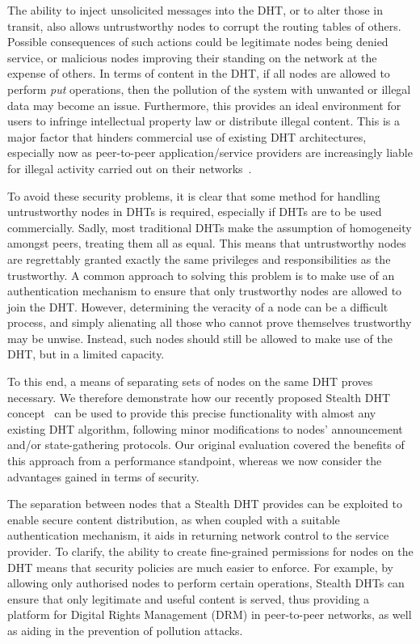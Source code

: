\documentclass{elsart3p}
\begin{document}
The ability to inject unsolicited messages into the DHT, or to alter
those in transit, also allows untrustworthy nodes to corrupt the
routing tables of others. Possible consequences of such actions
could be legitimate nodes being denied service, or malicious nodes
improving their standing on the network at the expense of others. In
terms of content in the DHT, if all nodes are allowed to perform
\emph{put} operations, then the pollution of the system with
unwanted or illegal data may become an issue. Furthermore, this
provides an ideal environment for users to infringe intellectual
property law or distribute illegal content. This is a major factor
that hinders commercial use of existing DHT architectures,
especially now as peer-to-peer application/service providers are
increasingly liable for illegal activity carried out on their
networks~\cite{court}.

To avoid these security problems, it is clear that some method for
handling untrustworthy nodes in DHTs is required, especially if DHTs
are to be used commercially. Sadly, most traditional DHTs make the
assumption of homogeneity amongst peers, treating them all as equal.
This means that untrustworthy nodes are regrettably granted exactly
the same privileges and responsibilities as the trustworthy. A
common approach to solving this problem is to make use of an
authentication mechanism to ensure that only trustworthy nodes are
allowed to join the DHT. However, determining the veracity of a node
can be a difficult process, and simply alienating all those who
cannot prove themselves trustworthy may be unwise. Instead, such
nodes should still be allowed to make use of the DHT, but in a
limited capacity.

To this end, a means of separating sets of nodes on the same DHT
proves necessary. We therefore demonstrate how our recently proposed
Stealth DHT concept~\cite{Brampton06Stealth} can be used to provide
this precise functionality with almost any existing DHT algorithm,
following minor modifications to nodes' announcement and/or
state-gathering protocols. Our original evaluation covered the
benefits of this approach from a performance standpoint, whereas we
now consider the advantages gained in terms of security.

The separation between nodes that a Stealth DHT provides can be
exploited to enable secure content distribution, as when coupled
with a suitable authentication mechanism, it aids in returning
network control to the service provider. To clarify, the ability to
create fine-grained permissions for nodes on the DHT means that
security policies are much easier to enforce. For example, by
allowing only authorised nodes to perform certain operations,
Stealth DHTs can ensure that only legitimate and useful content is
served, thus providing a platform for Digital Rights Management
(DRM) in peer-to-peer networks, as well as aiding in the prevention
of pollution attacks.
\end{document}
